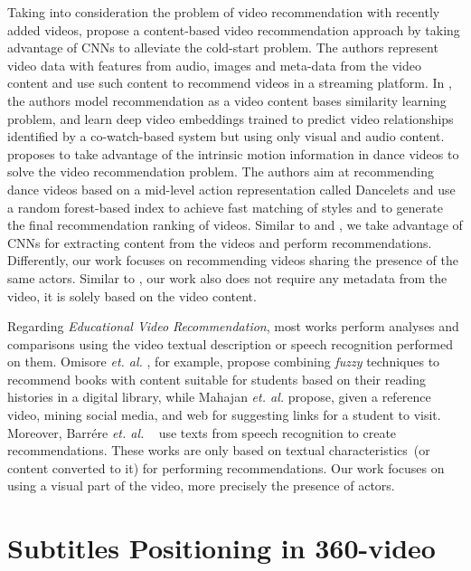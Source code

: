 Taking into consideration the problem of video recommendation with recently added videos, \cite{li2017study} propose a content-based video recommendation approach by taking advantage of CNNs to alleviate the cold-start problem. The authors represent video data with features from audio, images and meta-data from the video content and use such content to recommend videos in a streaming platform. In \cite{lee2017large}, the authors model recommendation as a video content bases similarity learning problem, and learn deep video embeddings trained to predict video relationships identified by a co-watch-based system but using only visual and audio content. \cite{han2016dancelets} proposes to take advantage of the intrinsic motion information in dance videos to solve the video recommendation problem. The authors aim at recommending dance videos based on a mid-level action representation called Dancelets and use a random forest-based index to achieve fast matching of styles and to generate the final recommendation ranking of videos. Similar to \cite{li2017study} and \cite{lee2017large}, we take advantage of CNNs for extracting content from the videos and perform recommendations. Differently, our work focuses on recommending videos sharing the presence of the same actors. Similar to \cite{han2016dancelets}, our work also does not require any metadata from the video, it is solely based on the video content.

Regarding \textit{Educational Video Recommendation}, most works perform analyses and comparisons using the video textual description or speech recognition performed on them. Omisore \textit{et. al.} \cite{omisore2014personalized}, for example, propose combining \textit{fuzzy} techniques to recommend books with content suitable for students based on their reading histories in a digital library, while Mahajan \textit{et. al.} \cite{mahajan2015optimising} propose, given a reference video,  mining social media, and web for suggesting links for a student to visit.
Moreover, Barrére \textit{et. al.}
~\cite{barrere2020utilizaccao} use texts from speech recognition to create recommendations.
These works are only based on textual characteristics~(or content converted to it) for performing recommendations.
Our work focuses on using a visual part of the video, more precisely the presence of actors.


\section{Subtitles Positioning in 360-video}
\label{sec:subtitles}

